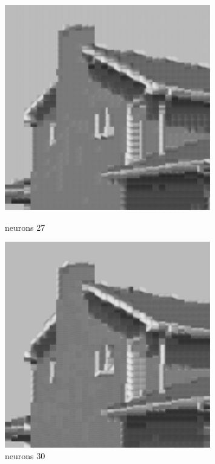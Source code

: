 \documentclass[../IDP_Task5_Karwowski_Kowalewski.tex]{subfiles}
\begin{document}
{{        \begin{figure}[!htbp]
            \begin{minipage}[c]{0.45\linewidth}
                \centering
                \includegraphics[width=0.8\textwidth]{img/kowalewski/crop_size_8_neurons_27.png}
                \caption{neurons 27}
            \end{minipage}\hfill
            \begin{minipage}[c]{0.45\linewidth}
                \centering
                \includegraphics[width=0.8\textwidth]{img/kowalewski/crop_size_8_neurons_30.png}
                \caption{neurons 30}
            \end{minipage}
        \end{figure}

}}
\end{document}
